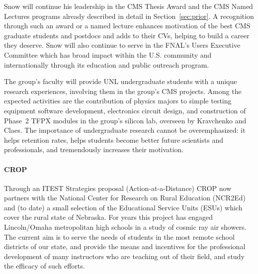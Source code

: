 
\noindent
Snow will continue his leadership in the CMS Thesis Award and the CMS Named Lectures programs already described in detail in Section~\ref{sec:prior}. A recognition through such an award or a named lecture enhances motivation of the best CMS graduate students and postdocs and adds to their CVs, helping to build a career they deserve.  Snow will also continue to serve in the FNAL's Users Executive Committee which has broad impact within the U.S. community and internationally through its education and public outreach program.

The group's faculty will provide UNL undergraduate students with a unique research experiences, involving them in the group's CMS projects. Among the expected activities are the contribution of physics majors to simple testing equipment software development, electronics circuit design, and construction of Phase~2 TFPX modules in the group's silicon lab, overseen by Kravchenko and Claes. The importance of undergraduate research cannot be  overemphasized: it helps retention rates, helps students become better future 
scientists and professionals, and tremendously increases their motivation.

\paragraph{CROP}
Through an ITEST Strategies proposal (Action-at-a-Distance) CROP now partners with the National Center for Research on Rural Education (NCR2Ed) and (to date) a small selection of the Educational Service Units (ESUs) which cover the rural state of Nebraska. For years this project has engaged Lincoln/Omaha metropolitan high schools in a study of cosmic ray air showers. The current aim is to serve the needs of students in the most remote school districts of our state, and provide the means and incentives for the professional development of many instructors who are teaching out of their field, and study the efficacy of such efforts. 

